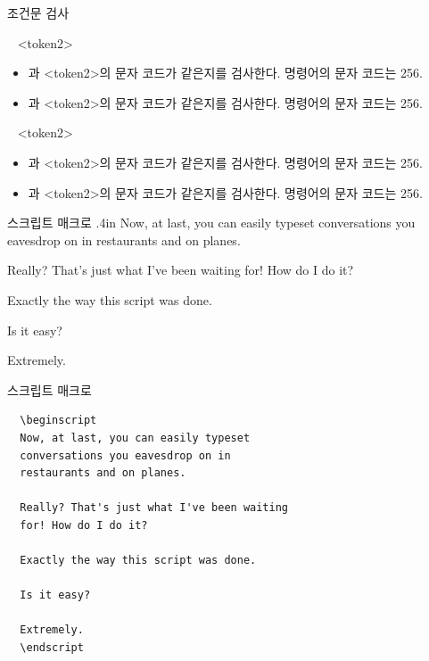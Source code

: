 \documentclass{beamer}
\begin{document}
%


%
\begin{frame}[fragile]{조건문 검사}
  \begin{exampleblock}{\string\if\ <token1> <token2>}
    \begin{itemize}
    \item <token1>과 <token2>의 문자 코드가 같은지를 검사한다. 명령어의 문자 코드는 256.
    \item <token1>과 <token2>의 문자 코드가 같은지를 검사한다. 명령어의 문자 코드는 256.
    \end{itemize}
  \end{exampleblock}
  \begin{exampleblock}{\string\ifx\ <token1> <token2>}
    \begin{itemize}
    \item <token1>과 <token2>의 문자 코드가 같은지를 검사한다. 명령어의 문자 코드는 256.
    \item <token1>과 <token2>의 문자 코드가 같은지를 검사한다. 명령어의 문자 코드는 256.
    \end{itemize}
  \end{exampleblock}
\end{frame}


%
\newcount\spk
\def\beginscript{\bgroup \parindent=0pt \rm \spk=1 \rightskip.4in
  \def\par{\ifnum\spk=1 \endgraf \sl \spk=2 \leftskip.4in \rightskip0in
    \else \endgraf \rm \spk=1 \leftskip0in \rightskip.4in \fi}}
\def\endscript {\egroup}

\begin{frame}[fragile]{스크립트 매크로}
  \hsize 3in
  \beginscript
  Now, at last, you can easily typeset
  conversations you eavesdrop on in
  restaurants and on planes.
  
  Really? That's just what I've been waiting
  for! How do I do it?
  
  Exactly the way this script was done.
  
  Is it easy?
  
  Extremely.
  \endscript
\end{frame}


%
\begin{frame}[fragile]{스크립트 매크로}
  \begin{verbatim}
  \beginscript
  Now, at last, you can easily typeset
  conversations you eavesdrop on in
  restaurants and on planes.
  
  Really? That's just what I've been waiting
  for! How do I do it?
  
  Exactly the way this script was done.
  
  Is it easy?
  
  Extremely.
  \endscript
  \end{verbatim}
\end{frame}
\end{document}
